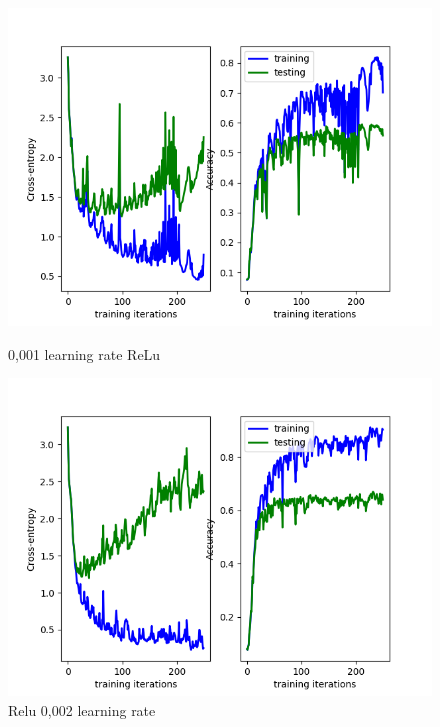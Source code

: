 \documentclass[11pt]{article} %
\begin{document}
\begin{figure}[H]
  \centering
  \begin{minipage}[b]{0.4\textwidth}
    \includegraphics[width=\textwidth]{images/1relu0,001}
    \caption{0,001 learning rate ReLu}
  \end{minipage}
  \hfill
  \begin{minipage}[b]{0.4\textwidth}
    \includegraphics[width=\textwidth]{images/1relu0,002}
    \caption{Relu 0,002 learning rate}
  \end{minipage}
\end{figure}
\end{document}
